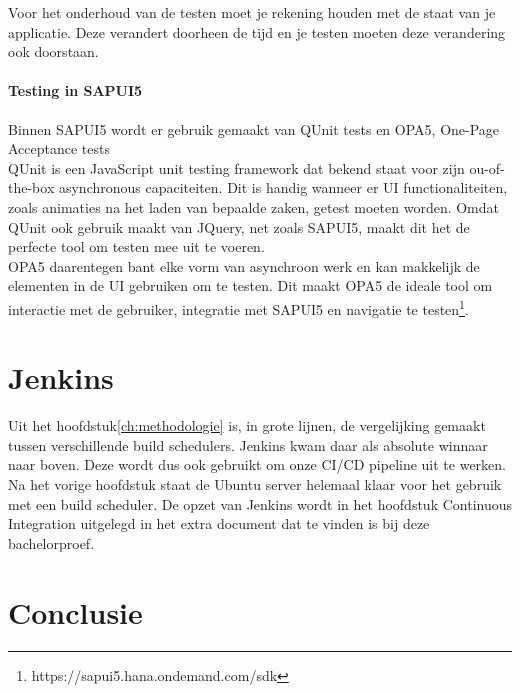 Voor het onderhoud van de testen moet je rekening houden met de staat van je applicatie. Deze verandert doorheen de tijd en je testen moeten deze verandering ook doorstaan.

    \paragraph{Testing in SAPUI5}
    Binnen SAPUI5 wordt er gebruik gemaakt van QUnit tests en OPA5, One-Page Acceptance tests\\
    QUnit is een JavaScript unit testing framework dat bekend staat voor zijn ou-of-the-box asynchronous capaciteiten. Dit is handig wanneer er UI functionaliteiten, zoals animaties na het laden van bepaalde zaken, getest moeten worden. Omdat QUnit ook gebruik maakt van JQuery, net zoals SAPUI5, maakt dit het de perfecte tool om testen mee uit te voeren.\\
    OPA5 daarentegen bant elke vorm van asynchroon werk en kan makkelijk de elementen in de UI gebruiken om te testen. Dit maakt OPA5 de ideale tool om interactie met de gebruiker, integratie met SAPUI5 en navigatie te testen\footnote{https://sapui5.hana.ondemand.com/sdk}.
    
\section{Jenkins}
\label{sec:short-list}
Uit het hoofdstuk\ref{ch:methodologie} is, in grote lijnen, de vergelijking gemaakt tussen verschillende build schedulers. Jenkins kwam daar als absolute winnaar naar boven. Deze wordt dus ook gebruikt om onze CI/CD pipeline uit te werken.
Na het vorige hoofdstuk staat de Ubuntu server helemaal klaar voor het gebruik met een build scheduler. De opzet van Jenkins wordt in het hoofdstuk Continuous Integration uitgelegd in het extra document dat te vinden is bij deze bachelorproef.
    
\section{Conclusie}
\label{sec:conclusie}
